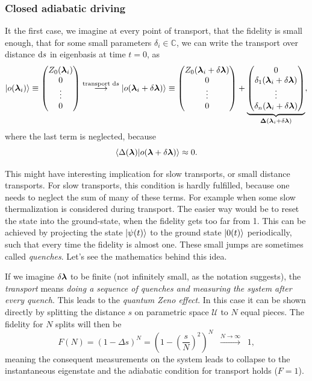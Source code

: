 \subsubsection{Closed adiabatic driving}
It the first case, we imagine at every point of transport, that the fidelity is small enough, that for some small parameters $\delta_i\in \mathbb{C}$, we can write the transport over distance $\mathrm{d} s$ in eigenbasis at time $t=0$, as
$$\ket{o({\bm\lambda}_i)}\equiv \begin{pmatrix}
    Z_0({\bm\lambda}_i)\\
    0\\
    \vdots \\
    0
\end{pmatrix} \overset{\text{transport }\mathrm{d} s}{\longrightarrow} \ket{o({\bm\lambda}_i+\delta {\bm\lambda})}\equiv\begin{pmatrix}
    Z_0({\bm\lambda}_i+\delta {\bm\lambda})\\
    0\\
    \vdots \\
    0
\end{pmatrix} +\underbrace{\begin{pmatrix}
    0\\
    \delta_1({\bm\lambda}_i+\delta {\bm\lambda})\\
    \vdots \\
    \delta_n({\bm\lambda}_i+\delta {\bm\lambda})
\end{pmatrix}}_{\mathbf{\Delta}({\bm\lambda}_i+\delta {\bm\lambda})}, $$
where the last term is neglected, because
$$\braket{\Delta({\bm\lambda})|o({\bm\lambda}+\delta{\bm\lambda})}\approx 0.$$

This might have interesting implication for slow transports, or small distance transports. For slow transports, this condition is hardly fulfilled, because one needs to neglect the sum of many of these terms. For example when some slow thermalization is considered during transport. The easier way would be to reset the state into the ground-state, when the fidelity gets too far from 1. This can be achieved by projecting the state $\ket{\psi(t)}$ to the ground state $\ket{0(t)}$ periodically, such that every time the fidelity is almost one. These small jumps are sometimes called \emph{quenches}. Let's see the mathematics behind this idea.




If we imagine $\delta{\bm\lambda}$ to be finite (not infinitely small, as the notation suggests), the \emph{transport} means \emph{doing a sequence of quenches and measuring the system after every quench}. This leads to the \emph{quantum Zeno effect}. In this case it can be shown directly by splitting the distance $s$ on parametric space $\mathcal U$ to $N$ equal pieces. The fidelity for $N$ splits will then be
\begin{equation}
    F(N)=(1-\Delta s)^N=\left(1-\left(\frac{s}{N}\right)^2\right)^N \;\;\overset{N\rightarrow\infty}{\longrightarrow}\;\; 1,
\end{equation}
meaning the consequent measurements on the system leads to collapse to the instantaneous eigenstate and the adiabatic condition for transport holds ($F=1$). 

